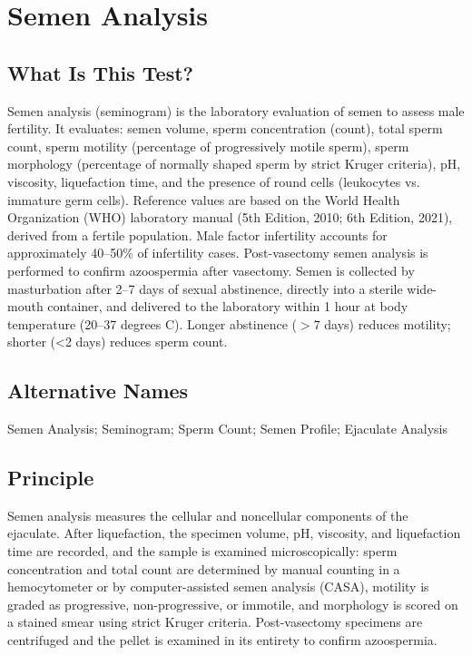 \chapter{Semen Analysis}
\section*{What Is This Test?}
Semen analysis (seminogram) is the laboratory evaluation of semen to assess male fertility. It evaluates: semen volume, sperm concentration (count), total sperm count, sperm motility (percentage of progressively motile sperm), sperm morphology (percentage of normally shaped sperm by strict Kruger criteria), pH, viscosity, liquefaction time, and the presence of round cells (leukocytes vs. immature germ cells). Reference values are based on the World Health Organization (WHO) laboratory manual (5th Edition, 2010; 6th Edition, 2021), derived from a fertile population. Male factor infertility accounts for approximately 40--50\% of infertility cases. Post-vasectomy semen analysis is performed to confirm azoospermia after vasectomy. Semen is collected by masturbation after 2--7 days of sexual abstinence, directly into a sterile wide-mouth container, and delivered to the laboratory within 1 hour at body temperature (20--37 degrees C). Longer abstinence ($>$7 days) reduces motility; shorter (<2 days) reduces sperm count.
\section*{Alternative Names}
Semen Analysis; Seminogram; Sperm Count; Semen Profile; Ejaculate Analysis
\section*{Principle}
Semen analysis measures the cellular and noncellular components of the ejaculate. After liquefaction, the specimen volume, pH, viscosity, and liquefaction time are recorded, and the sample is examined microscopically: sperm concentration and total count are determined by manual counting in a hemocytometer or by computer-assisted semen analysis (CASA), motility is graded as progressive, non-progressive, or immotile, and morphology is scored on a stained smear using strict Kruger criteria. Post-vasectomy specimens are centrifuged and the pellet is examined in its entirety to confirm azoospermia.
